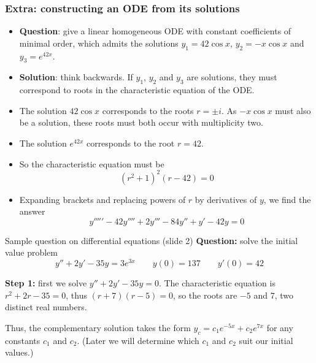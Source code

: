 \begin{frame}
	\frametitle{Extra: constructing an ODE from its solutions}{\small
		\begin{itemize}
			\item\textbf{Question}: give a linear homogeneous ODE with constant coefficients of minimal order, which admits the solutions $y_1=42\cos x$, $y_2=-x\cos x$ and $y_3=e^{42x}$.

			\pause\item\textbf{Solution}: think backwards. If $y_1$, $y_2$ and $y_3$ are solutions, they must correspond to roots in the characteristic equation of the ODE.
			\pause\item The solution $42\cos x$ corresponds to the roots $r=\pm i$. \pause{}As $-x\cos x$ must also be a solution, these roots must both occur with multiplicity two.

			      \pause\item The solution $e^{42x}$ corresponds to the root $r=42$.

			      \pause\item So the characteristic equation must be $$(r^2+1)^2(r-42)=0$$
			      \item\pause Expanding brackets and replacing powers of $r$ by derivatives of $y$, we find the answer
                      \[\boxed{y'''''-42y''''+2y'''-84y''+y'-42y=0}\]
		\end{itemize}

	}
\end{frame}







































\iffalse

\begin{frame}{Sample question on differential equations (slide 2)}
    \textbf{Question:} solve the initial value problem \[y''+2y'-35y=3e^{3x}\qquad y(0)=137\qquad y'(0)=42\]
    
    \textbf{Step 1:} first we solve $y''+2y'-35y=0$. The characteristic equation is $r^2+2r-35=0$, thus $(r+7)(r-5)=0$, so the roots are $-5$ and $7$, two distinct real numbers.

    Thus, the complementary solution takes the form $y_c = c_1e^{-5x} + c_2e^{7x}$ for any constants $c_1$ and $c_2$. (Later we will determine which $c_1$ and $c_2$ suit our initial values.)
\end{frame}


